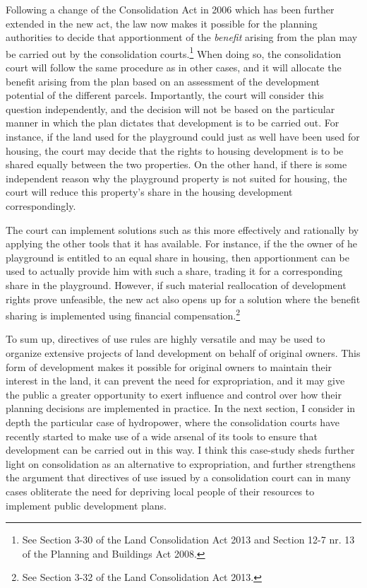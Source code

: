 Following a change of the Consolidation Act in 2006 which has been further extended in the new act, the law now makes it possible for the planning authorities to decide that apportionment of the \emph{benefit} arising from the plan may be carried out by the consolidation courts.\footnote{See Section 3-30 of the Land Consolidation Act 2013 and Section 12-7 nr. 13 of the Planning and Buildings Act 2008.} When doing so, the consolidation court will follow the same procedure as in other cases, and it will allocate the benefit arising from the plan based on an assessment of the development potential of the different parcels. Importantly, the court will consider this question independently, and the decision will not be based on the particular manner in which the plan dictates that development is to be carried out. For instance, if the land used for the playground could just as well have been used for housing, the court may decide that the rights to housing development is to be shared equally between the two properties. On the other hand, if there is some independent reason why the playground property is not suited for housing, the court will reduce this property's share in the housing development correspondingly.

The court can implement solutions such as this more effectively and rationally by applying the other tools that it has available. For instance, if the the owner of he playground is entitled to an equal share in housing, then apportionment can be used to actually provide him with such a share, trading it for a corresponding share in the playground. However, if such material reallocation of development rights prove unfeasible, the new act also opens up for a solution where the benefit sharing is implemented using financial compensation.\footnote{See Section 3-32 of the Land Consolidation Act 2013.}

To sum up, directives of use rules are highly versatile and may be used to organize extensive projects of land development on behalf of original owners. This form of development makes it possible for original owners to maintain their interest in the land, it can prevent the need for expropriation, and it may give the public a greater opportunity to exert influence and control over how their planning decisions are implemented in practice. In the next section, I consider in depth the particular case of hydropower, where the consolidation courts have recently started to make use of a wide arsenal of its tools to ensure that development can be carried out in this way. I think this case-study sheds further light on consolidation as an alternative to expropriation, and further strengthens the argument that directives of use issued by a consolidation court can in many cases obliterate the need for depriving local people of their resources to implement public development plans.

